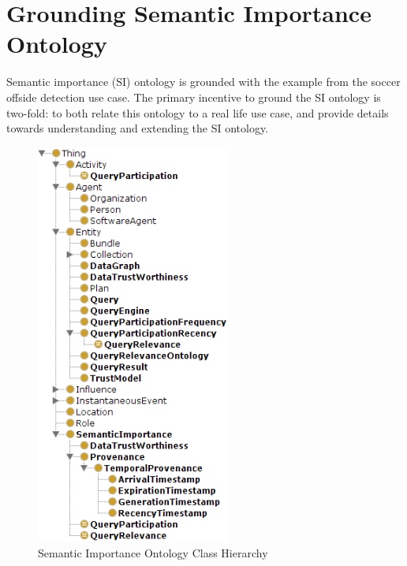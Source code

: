  
\appendix    %

\chapter{Grounding Semantic Importance Ontology}
Semantic importance (SI) ontology is grounded with the example from the soccer offside detection use case.
The primary incentive to ground the SI ontology is two-fold: to both relate this ontology to a real life use case, and provide details towards understanding and extending the SI ontology.

\begin{figure}[!htbp]
    \centering
    \includegraphics[width=2.5in]{img/app-sio.png}
    \caption{Semantic Importance Ontology Class Hierarchy}
    \label{fig:app-sio}
\end{figure}

